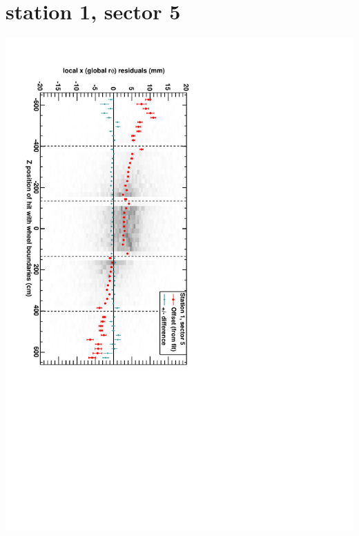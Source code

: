 \documentclass[compress]{beamer}
\begin{document}
\section*{station 1, sector 5}
\begin{frame} \vfill \mbox{\hspace{-1 cm}\includegraphics[height=1.2\linewidth, angle=90]{DTrphiVsZ_st1_sr05.pdf}} \end{frame}
\end{document}
